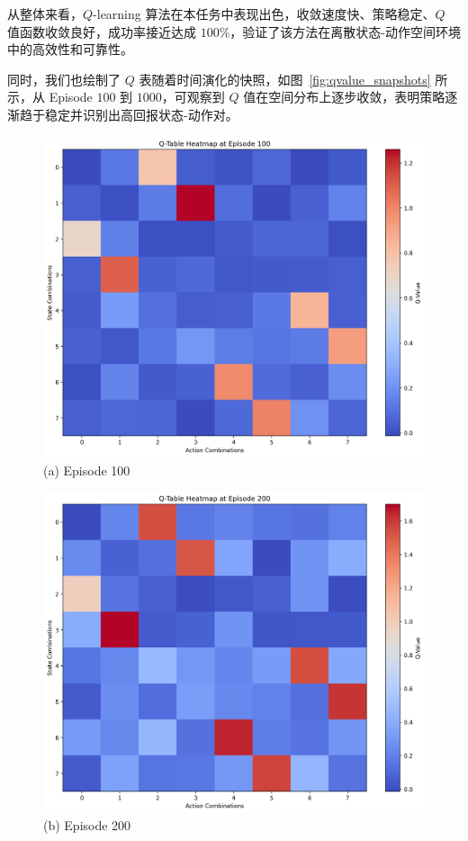 从整体来看，\(Q\)-learning 算法在本任务中表现出色，收敛速度快、策略稳定、\(Q\) 值函数收敛良好，成功率接近达成 \(100\%\)，验证了该方法在离散状态-动作空间环境中的高效性和可靠性。

同时，我们也绘制了 \(Q\) 表随着时间演化的快照，如图~\ref{fig:qvalue_snapshots} 所示，从 Episode \(100\) 到 \(1000\)，可观察到 \(Q\) 值在空间分布上逐步收敛，表明策略逐渐趋于稳定并识别出高回报状态-动作对。

\begin{figure}[htbp]
    \centering

    \begin{minipage}{0.45\textwidth}
        \includegraphics[width=\linewidth]{figure/multi_switch/q_heatmap_episode_100.png}
        \centering (a) Episode 100
    \end{minipage}
    \hfill
    \begin{minipage}{0.45\textwidth}
        \includegraphics[width=\linewidth]{figure/multi_switch/q_heatmap_episode_200.png}
        \centering (b) Episode 200
    \end{minipage}


\end{figure}

